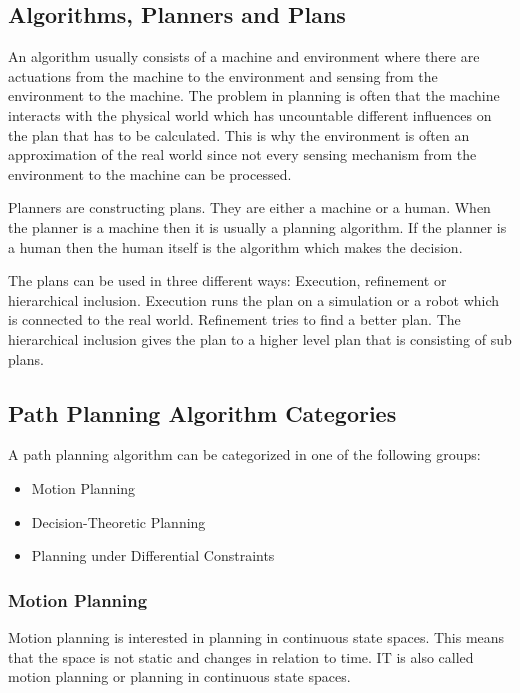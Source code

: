 \subsection{Algorithms, Planners and Plans}
An algorithm usually consists of a machine and environment where there are actuations from the machine to the environment and sensing from the environment to the machine. The problem in planning is often that the machine interacts with the physical world which has uncountable different influences on the plan that has to be calculated. This is why the environment is often an approximation of the real world since not every sensing mechanism from the environment to the machine can be processed.

Planners are constructing plans. They are either a machine or a human. When the planner is a machine then it is usually a planning algorithm. If the planner is a human then the human itself is the algorithm which makes the decision.

The plans can be used in three different ways: Execution, refinement or hierarchical inclusion. Execution runs the plan on a simulation or a robot which is connected to the real world. Refinement tries to find a better plan. The hierarchical inclusion gives the plan to a higher level plan that is consisting of sub plans.

\cite{planning_algorithms_steven_m_lavalle}

\subsection{Path Planning Algorithm Categories}
A path planning algorithm can be categorized in one of the following groups:
\begin{itemize}
    \item Motion Planning
    \item Decision-Theoretic Planning
    \item Planning under Differential Constraints
\end{itemize}

\subsubsection{Motion Planning}

Motion planning is interested in planning in continuous state spaces. This means that the space is not static and changes in relation to time. IT is also called motion planning or planning in continuous state spaces.

